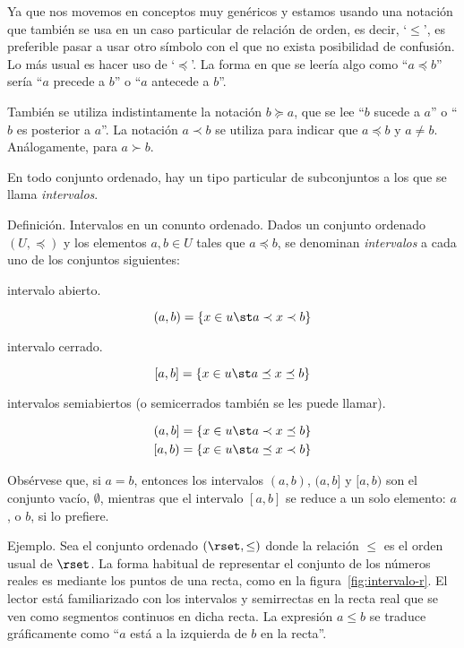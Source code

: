 Ya que nos movemos en conceptos muy genéricos y estamos usando una notación
que también se usa en un caso particular de relación de orden, es decir,
`$\leq$', es preferible pasar a usar otro símbolo con el que no exista
posibilidad de confusión. Lo más usual es hacer uso de `$\preceq$'. La forma
en que se leería algo como ``$a \preceq b$'' sería ``$a$ precede a $b$'' o
``$a$ antecede a $b$''.

También se utiliza indistintamente la notación $b \succeq a$, que se lee
``$b$ sucede a $a$'' o ``$b$ es posterior a $a$''. La notación $a \prec b$
se utiliza para indicar que $a \preceq b$ y $a \neq b$. Análogamente, para
$a \succ b$.

En todo conjunto ordenado, hay un tipo particular de subconjuntos a los que
se llama \emph{intervalos}.

Definición. Intervalos en un conunto ordenado. Dados un conjunto ordenado
$(U, \preceq)$ y los elementos $a, b \in U$ tales que $a \preceq b$, se
denominan \emph{intervalos} a cada uno de los conjuntos siguientes:


intervalo abierto.

$$ (a, b) = \{x \in u \st a \prec x \prec b\} $$

intervalo cerrado.

$$ [a, b] = \{x \in u \st a \preceq x \preceq b\} $$

intervalos semiabiertos (o semicerrados también se les puede llamar).

\begin{align*}
  (a, b] &= \{x \in u \st a \prec x \preceq b\} \\
  [a, b) &= \{x \in u \st a \preceq x \prec b\} \\
\end{align*}

Obsérvese que, si $a = b$, entonces los intervalos $(a, b)$, $(a, b]$ y $[a,
b)$ son el conjunto vacío, $\emptyset$, mientras que el intervalo $[a, b]$
se reduce a un solo elemento: $a$, o $b$, si lo prefiere.

Ejemplo. Sea el conjunto ordenado $(\rset, \leq)$ donde la relación $\leq$
es el orden usual de $\rset$. La forma habitual de representar el conjunto
de los números reales es mediante los puntos de una recta, como en la
figura~\ref{fig:intervalo-r}. El lector está familiarizado con los
intervalos y semirrectas en la recta real que se ven como segmentos
continuos en dicha recta. La expresión $a\leq b$ se traduce gráficamente
como ``$a$ está a la izquierda de $b$ en la recta''.

